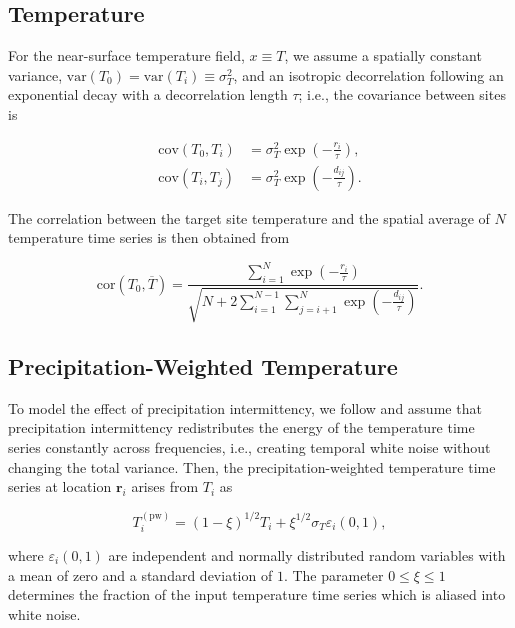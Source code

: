 \documentclass[draft]{agujournal2019}
\begin{document}
\subsection{Temperature}
\label{app:concept.model.t2m}

For the near-surface temperature field, $x \equiv T$, we assume a spatially
constant variance, $\mathrm{var}(T_0)=\mathrm{var}(T_i)\equiv\sigma_T^2$, and an
isotropic decorrelation following an exponential decay with a decorrelation
length $\tau$; i.e., the covariance between sites is
%
\begin{linenomath*}
\begin{align}
\label{eq:t2m.decorr}
\mathrm{cov}(T_0,T_i)&=\sigma_T^2\exp{\left(-\frac{r_i}{\tau}\right)},\\
\mathrm{cov}(T_i,T_j)&=\sigma_T^2\exp{\left(-\frac{d_{ij}}{\tau}\right)}.
\end{align}
\end{linenomath*}
%
The correlation between the target site temperature and the spatial average of
$N$ temperature time series is then obtained from
%
\begin{linenomath*}
\begin{equation}
\label{eq:t2m.corr}
\mathrm{cor}(T_0,\overline{T})=
\frac{\sum_{i=1}^{N}\exp{\left(-\frac{r_i}{\tau}\right)}}
{\sqrt{N+2\sum_{i=1}^{N-1}
\sum_{j=i+1}^{N}{\exp{\left(-\frac{d_{ij}}{\tau}\right)}}}}.
\end{equation}
\end{linenomath*}

\subsection{Precipitation-Weighted Temperature}
\label{app:concept.model.t2m.pw}

To model the effect of precipitation intermittency, we follow
 and assume that precipitation intermittency redistributes
the energy of the temperature time series constantly across frequencies,
i.e., creating temporal white noise without changing the total variance. Then,
the precipitation-weighted temperature time series at location $\mathbf{r}_i$
arises from $T_i$ as
%
\begin{linenomath*}
\begin{equation}
\label{eq:precip.weighting}
T_i^{\mathrm{(pw)}}=
\left(1-\xi\right)^{1/2}T_i + \xi^{1/2} \sigma_T \varepsilon_i(0,1),
\end{equation}
\end{linenomath*}
%
where $\varepsilon_i(0,1)$ are independent and normally distributed random
variables with a mean of zero and a standard deviation of $1$. The parameter
$0\leq\xi\leq1$ determines the fraction of the input temperature time series
which is aliased into white noise.
\end{document}
